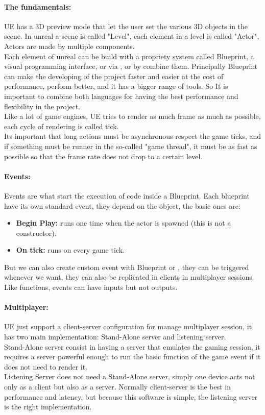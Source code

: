 \paragraph{The fundamentals:}
\ac{UE} has a 3D preview mode that let the user set the various 3D objects in the scene. 
In unreal a scene is called "Level", each element in a level is called "Actor", Actors are made by multiple components.\\
Each element of unreal can be build with a propriety system called Blueprint, a visual programming interface, or via \cpp, or by combine them.
Principally Blueprint can make the developing of the project faster and easier at the cost of performance, \cpp perform better, and it has a bigger range of tools.
So It is important to combine both languages for having the best performance and flexibility in the project.\\
Like a lot of game engines, \ac{UE} tries to render as much frame as much as possible, each cycle of rendering is called tick.\\
Its important that long actions must be asynchronous respect the game ticks, and if something must be runner in the so-called "game thread", it must be as fast as possible so that the frame rate does not drop to a certain level.

\paragraph{Events:}
Events are what start the execution of code inside a Blueprint. Each blueprint have its own standard event, they depend on the object, the basic ones are:
\begin{itemize}
  \item \textbf{Begin Play:} runs one time when the actor is spawned (this is not a constructor).
  \item \textbf{On tick:} runs on every game tick.
\end{itemize}
\noindent
But we can also create custom event with Blueprint or \cpp, they can be triggered whenever we want, they can also be replicated in clients in multiplayer sessions. 
Like functions, events can have inputs but not outputs.

\paragraph*{Multiplayer:}
\ac{UE} just support a client-server configuration for manage multiplayer session, it has two main implementation: Stand-Alone server and listening server.\\
Stand-Alone server consist in having a server that emulates the gaming session, it requires a server powerful enough to run the basic function of the game event if it does not need to render it.\\
Listening Server does not need a Stand-Alone server, simply one device acts not only as a client but also as a server. Normally client-server is the best in performance and latency, but because this software is simple, the listening server is the right implementation.

